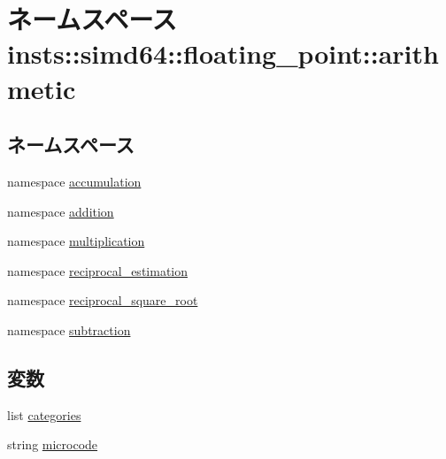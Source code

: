 \hypertarget{namespaceinsts_1_1simd64_1_1floating__point_1_1arithmetic}{
\section{ネームスペース insts::simd64::floating\_\-point::arithmetic}
\label{namespaceinsts_1_1simd64_1_1floating__point_1_1arithmetic}
}
\subsection*{ネームスペース}
\begin{DoxyCompactItemize}
\item 
namespace \hyperlink{namespaceinsts_1_1simd64_1_1floating__point_1_1arithmetic_1_1accumulation}{accumulation}
\item 
namespace \hyperlink{namespaceinsts_1_1simd64_1_1floating__point_1_1arithmetic_1_1addition}{addition}
\item 
namespace \hyperlink{namespaceinsts_1_1simd64_1_1floating__point_1_1arithmetic_1_1multiplication}{multiplication}
\item 
namespace \hyperlink{namespaceinsts_1_1simd64_1_1floating__point_1_1arithmetic_1_1reciprocal__estimation}{reciprocal\_\-estimation}
\item 
namespace \hyperlink{namespaceinsts_1_1simd64_1_1floating__point_1_1arithmetic_1_1reciprocal__square__root}{reciprocal\_\-square\_\-root}
\item 
namespace \hyperlink{namespaceinsts_1_1simd64_1_1floating__point_1_1arithmetic_1_1subtraction}{subtraction}
\end{DoxyCompactItemize}
\subsection*{変数}
\begin{DoxyCompactItemize}
\item 
list \hyperlink{namespaceinsts_1_1simd64_1_1floating__point_1_1arithmetic_a273cf0f1630af14c1582f05e53354a55}{categories}
\item 
string \hyperlink{namespaceinsts_1_1simd64_1_1floating__point_1_1arithmetic_a770f11a173e99389a8802f0107ed8f52}{microcode}
\end{DoxyCompactItemize}


